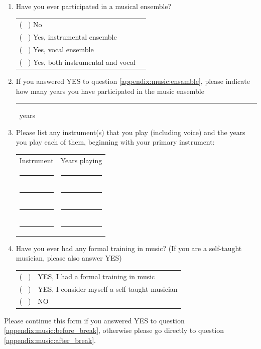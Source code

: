 \documentclass[a4paper,11pt]{article}
\newcommand{\myunderline}{\rule{2in}{.5pt}}
\begin{document}
{\begin{appendices}
\begin{enumerate}[resume]
	\myunderline

	\item \label{appendix:music:ensamble}Have you ever participated in a musical ensemble?

	\begin{tabular}{l l}
		( \ ) No \\
		( \ ) Yes, instrumental ensemble \\
		( \ ) Yes, vocal ensemble \\
		( \ ) Yes, both instrumental and vocal \\
	\end{tabular}

	\item If you answered YES to question \ref{appendix:music:ensamble}, please indicate how many years you have participated in the music ensemble

	\myunderline \ years

	\item Please list any instrument(s) that you play (including voice) and the years you play each of them, beginning with your primary instrument:

	\begin{tabular}{c c}
		Instrument &  Years playing \\
		\myunderline & \myunderline \\
		\myunderline & \myunderline \\
		\myunderline & \myunderline \\
		\myunderline & \myunderline \\
	\end{tabular}

	\item \label{appendix:music:before_break}Have you ever had any formal training in music? (If you are a self-taught musician, please also answer YES)

	\begin{tabular}{l l}
		( \ ) & YES, I had a formal training in music \\
		( \ ) & YES, I consider myself a self-taught musician \\
		( \ ) & NO \\
	\end{tabular}

\end{enumerate}
Please continue this form if you answered YES to question \ref{appendix:music:before_break}, otherwise please go directly to question \ref{appendix:music:after_break}.
\begin{enumerate}[resume]


\end{enumerate}
\end{appendices}}
\end{document}
